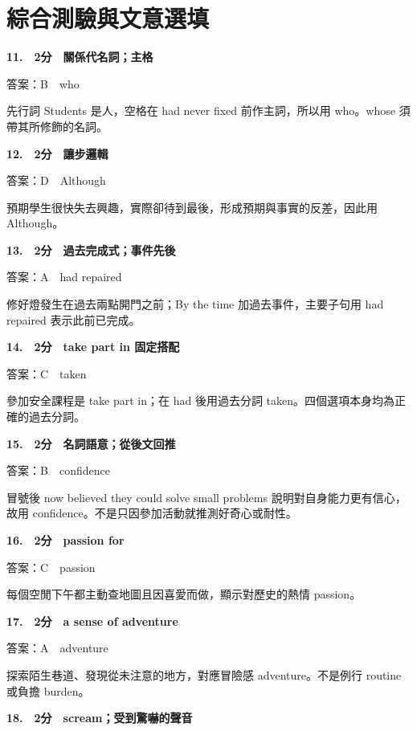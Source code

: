 \documentclass[11pt,a4paper]{article}
\begin{document}
\section*{綜合測驗與文意選填}
\textbf{11.　2分　關係代名詞；主格}\par
答案：B　who
\par\smallskip
先行詞 Students 是人，空格在 had never fixed 前作主詞，所以用 who。whose 須帶其所修飾的名詞。
\par\smallskip
\medskip
{}\textbf{12.　2分　讓步邏輯}\par
答案：D　Although
\par\smallskip
預期學生很快失去興趣，實際卻待到最後，形成預期與事實的反差，因此用 Although。
\par\smallskip
\medskip
{}\textbf{13.　2分　過去完成式；事件先後}\par
答案：A　had repaired
\par\smallskip
修好燈發生在過去兩點開門之前；By the time 加過去事件，主要子句用 had repaired 表示此前已完成。
\par\smallskip
\medskip
{}\textbf{14.　2分　take part in 固定搭配}\par
答案：C　taken
\par\smallskip
參加安全課程是 take part in；在 had 後用過去分詞 taken。四個選項本身均為正確的過去分詞。
\par\smallskip
\medskip
{}\textbf{15.　2分　名詞語意；從後文回推}\par
答案：B　confidence
\par\smallskip
冒號後 now believed they could solve small problems 說明對自身能力更有信心，故用 confidence。不是只因參加活動就推測好奇心或耐性。
\par\smallskip
\medskip
{}\textbf{16.　2分　passion for}\par
答案：C　passion
\par\smallskip
每個空閒下午都主動查地圖且因喜愛而做，顯示對歷史的熱情 passion。
\par\smallskip
\medskip
{}\textbf{17.　2分　a sense of adventure}\par
答案：A　adventure
\par\smallskip
探索陌生巷道、發現從未注意的地方，對應冒險感 adventure。不是例行 routine 或負擔 burden。
\par\smallskip
\medskip
{}\textbf{18.　2分　scream；受到驚嚇的聲音}\par
\end{document}
